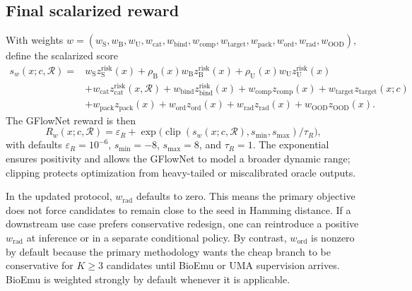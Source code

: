 \documentclass[11pt]{article}
\begin{document}
	
	
	\subsection{Final scalarized reward}
	
	With weights $w=(w_{\mathrm S},w_{\mathrm B},w_{\mathrm U},w_{\mathrm{cat}},w_{\mathrm{bind}},w_{\mathrm{comp}},w_{\mathrm{target}},w_{\mathrm{pack}},w_{\mathrm{ord}},w_{\mathrm{rad}},w_{\mathrm{OOD}})$, define the scalarized score
	\begin{equation}
		\label{eq:score}
		\begin{aligned}
			s_w(x;c,\mathcal{R})={}&w_{\mathrm S}z_{\mathrm S}^{\mathrm{risk}}(x)+\rho_{\mathrm B}(x)w_{\mathrm B}z_{\mathrm B}^{\mathrm{risk}}(x)+\rho_{\mathrm U}(x)w_{\mathrm U}z_{\mathrm U}^{\mathrm{risk}}(x)\\
			&+w_{\mathrm{cat}}z_{\mathrm{cat}}^{\mathrm{risk}}(x,\mathcal{R})+w_{\mathrm{bind}}z_{\mathrm{bind}}^{\mathrm{risk}}(x)+w_{\mathrm{comp}}z_{\mathrm{comp}}(x)+w_{\mathrm{target}}z_{\mathrm{target}}(x;c)\\
			&+w_{\mathrm{pack}}z_{\mathrm{pack}}(x)+w_{\mathrm{ord}}z_{\mathrm{ord}}(x)+w_{\mathrm{rad}}z_{\mathrm{rad}}(x)+w_{\mathrm{OOD}}z_{\mathrm{OOD}}(x).
		\end{aligned}
	\end{equation}
	The GFlowNet reward is then
	\begin{equation}
		\label{eq:reward}
		R_w(x;c,\mathcal{R})=\varepsilon_R + \exp\Big(\operatorname{clip}(s_w(x;c,\mathcal{R}), s_{\min}, s_{\max})/\tau_R\Big),
	\end{equation}
	with defaults $\varepsilon_R=10^{-6}$, $s_{\min}=-8$, $s_{\max}=8$, and $\tau_R=1$. The exponential ensures positivity and allows the GFlowNet to model a broader dynamic range; clipping protects optimization from heavy-tailed or miscalibrated oracle outputs.
	
	In the updated protocol, $w_{\mathrm{rad}}$ defaults to zero. This means the primary objective does not force candidates to remain close to the seed in Hamming distance. If a downstream use case prefers conservative redesign, one can reintroduce a positive $w_{\mathrm{rad}}$ at inference or in a separate conditional policy. By contrast, $w_{\mathrm{ord}}$ is nonzero by default because the primary methodology wants the cheap branch to be conservative for $K\ge 3$ candidates until BioEmu or UMA supervision arrives. BioEmu is weighted strongly by default whenever it is applicable.
	
\end{document}
